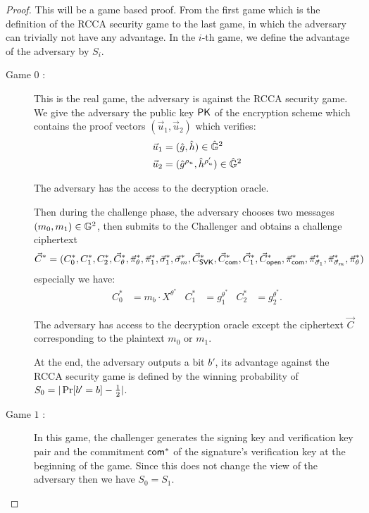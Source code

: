 \begin{proof}

  This will be a game based proof. From the first game which is the definition of the RCCA security game to the last game, in which the adversary can trivially not have any advantage. In the $i$-th game, we define the advantage of the adversary by $S_i$.

  \begin{description}
  \item[\textsf{Game} $0$ :] This is the real game, the adversary is against the RCCA security game. We give the adversary the public key $\mathsf{PK}$ of the encryption scheme which contains the proof vectors $(\vec{u}_1, \vec{u}_2)$ which verifies:
    \begin{align*}
      \vec{u}_1 &= (\hat{g}, \hat{h}) \in \hat{\mathbb{G}}^2\\
      \vec{u}_2 &= (\hat{g}^{\rho_u}, \hat{h}^{\rho_u'}) \in \hat{\mathbb{G}}^2
    \end{align*}

    The adversary has the access to the decryption oracle.
    
    Then during the challenge phase, the adversary chooses two messages $(m_0, m_1) \in \mathbb{G}^2$, then submits to the Challenger and obtains a challenge ciphertext
    \begin{align*}
      \vec{C}^* = (C_0^*, C_1^*, C_2^*, \vec{C}_{\theta}^*, \vec{\pi}_{\theta}^*, \vec{\pi}_{1}^*, \vec{\sigma}_1^*, \vec{\sigma}_m^*, \vec{C}_{\mathsf{SVK}}^*, \vec{C}_{\mathsf{com}}^*, \vec{C}_1^*, \vec{C}_{\mathsf{open}}^*, \vec{\pi}_{\mathsf{com}}^*, \vec{\pi}_{\vec{\sigma}_1}^*, \vec{\pi}_{\vec{\sigma}_m}^*, \vec{\pi}_{\theta}^*)
    \end{align*}
    especially we have:
    \begin{align*}
      C_0^* &= m_b \cdot X^{\theta^*} & C_1^* &= g_1^{\theta^*} & C_2^* &= g_2^{\theta^*}.
    \end{align*}

    The adversary has access to the decryption oracle except the ciphertext $\vec{C}$ corresponding to the plaintext $m_0$ or $m_1$.

    At the end, the adversary outputs a bit $b'$, its advantage against the RCCA security game is defined by the winning probability of $S_0 = |\operatorname{Pr}[b' = b] - \frac{1}{2}|$.

  \item[\textsf{Game} $1$ :] In this game, the challenger generates the signing key and verification key pair and the commitment $\mathsf{com}^*$ of the signature's verification key at the beginning of the game. Since this does not change the view of the adversary then we have $S_0 = S_1$.


\end{description}
\end{proof}

